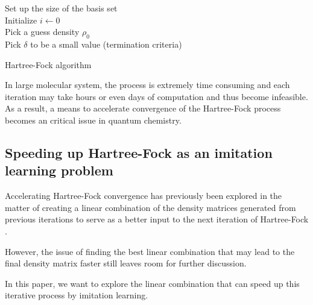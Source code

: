 \documentclass[twoside,11pt]{article}
\begin{document}
\begin{algorithm}[htb]
 \label{alg:hf}
	Set up the size of the basis set \\
	Initialize $i \leftarrow	 0$ \\	
	Pick a guess density $\rho_0$ \\
	Pick $\delta$ to be a small value (termination criteria) \\
 \caption{Hartree-Fock algorithm}
\end{algorithm}

In large molecular system, the process is extremely time consuming and each iteration may take hours or even days of computation and thus become infeasible. 
As a result, a means to accelerate convergence of the Hartree-Fock process becomes an critical issue in quantum chemistry.



\subsection{Speeding up Hartree-Fock as an imitation learning problem}


Accelerating Hartree-Fock convergence has previously been explored in the matter of creating a linear combination of the density matrices generated from previous iterations to serve as a better input to the next iteration of Hartree-Fock \cite{Pulay1980}. 


However, the issue of finding the best linear combination that may lead to the final density matrix faster still leaves room for further discussion.

In this paper,
we want to explore the linear combination that can speed up this iterative process by imitation learning. 


\end{document}
